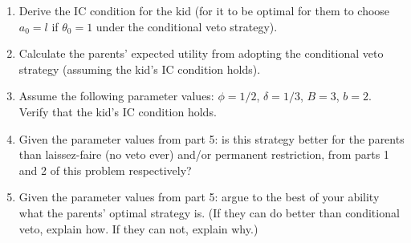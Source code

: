 \documentclass[a4paper]{article}
\newif\ifsolutions
\begin{document}
	\begin{enumerate}[resume]
		\item Derive the IC condition for the kid (for it to be optimal for them to choose $a_0=l$ if $\theta_0=1$ under the conditional veto strategy).
		
		\item Calculate the parents' expected utility from adopting the conditional veto strategy (assuming the kid's IC condition holds).
		
		\item Assume the following parameter values: $\phi=1/2$, $\delta=1/3$, $B=3$, $b=2$. Verify that the kid's IC condition holds.
		
		\item Given the parameter values from part 5: is this strategy better for the parents than laissez-faire (no veto ever) and/or permanent restriction, from parts 1 and 2 of this problem respectively?
		
		\item Given the parameter values from part 5: argue to the best of your ability what the parents' optimal strategy is. (If they can do better than conditional veto, explain how. If they can not, explain why.)
	\end{enumerate}
		
		
	
	
\ifsolutions
\end{document}
